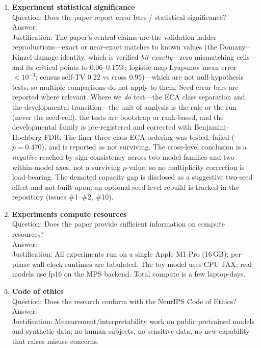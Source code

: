 \begin{enumerate}
\item {\bf Experiment statistical significance} \\
Question: Does the paper report error bars / statistical significance? \\
Answer: \answerYes{} \\
Justification: The paper's central claims are the validation-ladder reproductions---exact or near-exact matches to known values (the Domany--Kinzel damage identity, which is verified \emph{bit-exactly}---zero mismatching cells---and its critical points to $0.06$--$0.15\%$; logistic-map Lyapunov mean error $<10^{-3}$; census self-TV $0.22$ vs cross $0.95$)---which are not null-hypothesis tests, so multiple comparisons do not apply to them. Seed error bars are reported where relevant. Where we \emph{do} test---the ECA class separation and the developmental transition---the unit of analysis is the rule or the run (never the seed-cell), the tests are bootstrap or rank-based, and the developmental family is pre-registered and corrected with Benjamini--Hochberg FDR. The finer three-class ECA ordering was tested, failed ($p{=}0.470$), and is reported as not surviving. The cross-level conclusion is a \emph{negative} reached by sign-consistency across two model families and two within-model axes, not a surviving $p$-value, so no multiplicity correction is load-bearing. The demoted capacity gap is disclosed as a suggestive two-seed effect and not built upon; an optional seed-level rebuild is tracked in the repository (issues \#1--\#2, \#10).

\item {\bf Experiments compute resources} \\
Question: Does the paper provide sufficient information on compute resources? \\
Answer: \answerYes{} \\
Justification: All experiments run on a single Apple M1 Pro (16\,GB); per-phase wall-clock runtimes are tabulated. The toy model uses CPU JAX; real models use fp16 on the MPS backend. Total compute is a few laptop-days.

\item {\bf Code of ethics} \\
Question: Does the research conform with the NeurIPS Code of Ethics? \\
Answer: \answerYes{} \\
Justification: Measurement/interpretability work on public pretrained models and synthetic data; no human subjects, no sensitive data, no new capability that raises misuse concerns.


\end{enumerate}
